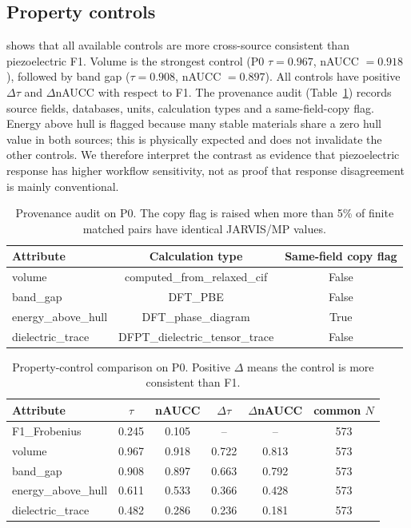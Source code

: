 \documentclass[11pt]{article}
\newcommand{\PZeroVolumeDeltaTau}{0.722}
\newcommand{\PZeroVolumeDeltaNaucc}{0.813}
\newcommand{\PZeroBandGapDeltaTau}{0.663}
\newcommand{\PZeroBandGapDeltaNaucc}{0.792}
\begin{document}
\subsection{Property controls}
 shows that all available controls are more cross-source consistent than piezoelectric F1.
Volume is the strongest control (P0 $\tau=0.967$, nAUCC $=0.918$), followed by band gap ($\tau=0.908$, nAUCC $=0.897$).
All controls have positive $\Delta\tau$ and $\Delta$nAUCC with respect to F1.
The provenance audit (Table~\ref{tab:provenance}) records source fields, databases, units, calculation types and a same-field-copy flag.
Energy above hull is flagged because many stable materials share a zero hull value in both sources; this is physically expected and does not invalidate the other controls.
We therefore interpret the contrast as evidence that piezoelectric response has higher workflow sensitivity, not as proof that response disagreement is mainly conventional.

\begin{table}[htbp]
\centering
\caption{Provenance audit on P0. The copy flag is raised when more than 5\% of finite matched pairs have identical JARVIS/MP values.}
\label{tab:provenance}
\begin{tabular}{lcc}
\toprule
Attribute & Calculation type & Same-field copy flag \\
\midrule
volume & computed\_from\_relaxed\_cif & False \\
band\_gap & DFT\_PBE & False \\
energy\_above\_hull & DFT\_phase\_diagram & True \\
dielectric\_trace & DFPT\_dielectric\_tensor\_trace & False \\
\bottomrule
\end{tabular}
\end{table}

\begin{table}[htbp]
\centering
\caption{Property-control comparison on P0. Positive $\Delta$ means the control is more consistent than F1.}
\label{tab:controls}
\begin{tabular}{lccccc}
\toprule
Attribute & $\tau$ & nAUCC & $\Delta\tau$ & $\Delta$nAUCC & common $N$ \\
\midrule
F1\_Frobenius & 0.245 & 0.105 & -- & -- & 573 \\
volume & 0.967 & 0.918 & \PZeroVolumeDeltaTau{} & \PZeroVolumeDeltaNaucc{} & 573 \\
band\_gap & 0.908 & 0.897 & \PZeroBandGapDeltaTau{} & \PZeroBandGapDeltaNaucc{} & 573 \\
energy\_above\_hull & 0.611 & 0.533 & 0.366 & 0.428 & 573 \\
dielectric\_trace & 0.482 & 0.286 & 0.236 & 0.181 & 573 \\
\bottomrule
\end{tabular}
\end{table}
\end{document}
